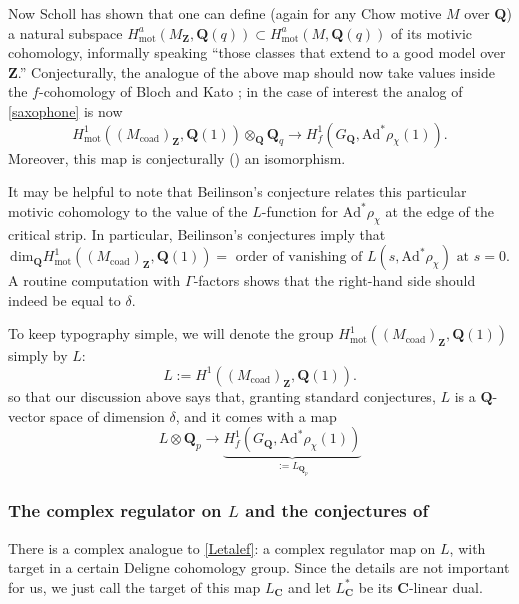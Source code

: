 \documentclass[10pt]{amsart}
\newcommand{\Z}{\mathbf{Z}}
\newcommand{\mot}{\mathrm{mot}}
\newcommand{\coad}{\mathrm{coad}}
\newcommand{\Ad}{\mathrm{Ad}}
\renewcommand{\dim}{\mathrm{dim}}
\newcommand{\Q}{\mathbf{Q}}
\newcommand{\C}{\mathbf{C}}
\theoremstyle{remark}
\begin{document}
%
Now Scholl \cite[Theorem 1.1.6]{scholl} has shown that one can define  (again for any Chow motive $M$ over $\Q$) 
a natural subspace  $H^a_{\mot}(M_{\Z}, \Q(q)) \subset H^a_{\mot}(M, \Q(q))$ of its motivic cohomology, informally speaking ``those classes that extend to a good model over $\mathbf{Z}$.''
Conjecturally, the analogue of the above map should now take values 
  inside the $f$-cohomology of Bloch and Kato \cite{BK}; in the case of interest  the analog of \eqref{saxophone} is now 
    $$H^1_{\mot}((M_{\coad})_{\Z}, \Q(1))  \otimes_{\Q} \Q_q \rightarrow H^1_f(G_{\Q}, \Ad^* \rho_{\chi}(1)).$$
Moreover, this map is conjecturally (\cite[5.3(ii)]{BK})  an isomorphism. 

It may be helpful to note that  Beilinson's conjecture relates this particular motivic cohomology to the value of the $L$-function for $\Ad^* \rho_{\chi}$  at the edge of the critical strip. In particular,
Beilinson's conjectures imply
that $$\dim_{\Q} H^1_{\mot}((M_{\coad})_{\Z}, \Q(1)) = \mbox{ order of vanishing  of $L(s, \Ad^* \rho_{\chi})$  at $s=0$.} $$
 A routine computation with $\Gamma$-factors shows that the right-hand side should indeed be equal to $\delta$. 



To keep typography simple, we will denote the group $H^1_{\mot}((M_{\coad})_{\Z},\Q(1))$ simply by $L$: 
\begin{equation} \label{LDef} L := H^1((M_{\coad})_{\Z}, \Q(1)). \end{equation}
so that our discussion above says that, granting standard conjectures, $L$ is a $\Q$-vector space of dimension $\delta$,  and it comes with a map
\begin{equation} \label{Letalef} L \otimes \Q_p \rightarrow \underbrace{ H^1_f(G_{\Q}, \Ad^* \rho_{\chi}(1))}_{:= L_{\Q_p}}\end{equation}
 


%
%
%
%
%
   

\subsubsection{The complex regulator on $L$ and the conjectures of \cite{PV}}
 There is a complex analogue to \eqref{Letalef}: a complex regulator map on $L$, with target in a certain Deligne cohomology group. Since the details are not important for us,
 we just  call the target of this map $L_{\C}$
 and let  $L_{\C}^*$  be its
$\C$-linear  dual.
\end{document}
